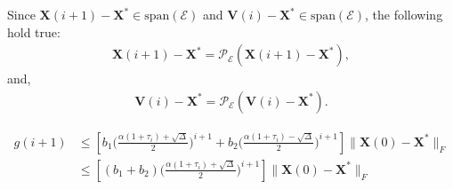 \documentclass[twocolumn]{svjour3}
\newcommand{\vectornormbig}[1]{\big\|#1\big\|}
\newcommand{\signal}{\boldsymbol{X}}
\newcommand{\bestsignal}{\boldsymbol{X}^\ast}
\begin{document}
Since $ \signal(i+1) - \bestsignal \in \text{span}(\mathcal{E}) $ and $ \boldsymbol{V}(i) - \bestsignal \in \text{span}(\mathcal{E}) $, the following hold true:
\begin{align}
\signal(i+1) - \bestsignal = \mathcal{P}_{\mathcal{E}} (\signal(i+1) - \bestsignal), \nonumber
\end{align} and,
\begin{align}
\boldsymbol{V}(i) - \bestsignal = \mathcal{P}_{\mathcal{E}} (\boldsymbol{V}(i) - \bestsignal). \nonumber 
\end{align} 

\begin{figure*}[!htp]
\begin{align}
g(i+1) &\leq \left[b_1\Big(\frac{\alpha (1+\tau_i) + \sqrt{\Delta}}{2} \Big)^{i+1} + b_2\Big(\frac{\alpha (1+\tau_i) - \sqrt{\Delta}}{2} \Big)^{i+1}\right]\vectornormbig{\signal(0) - \bestsignal}_F \nonumber \\ 
&\leq \left[(b_1 + b_2)\Big(\frac{\alpha (1+\tau_i) + \sqrt{\Delta}}{2} \Big)^{i+1}\right]\vectornormbig{\signal(0) - \bestsignal}_F \label{eq:mALPS_memory:09}
\end{align} 
\hrulefill
\end{figure*}
\end{document}
